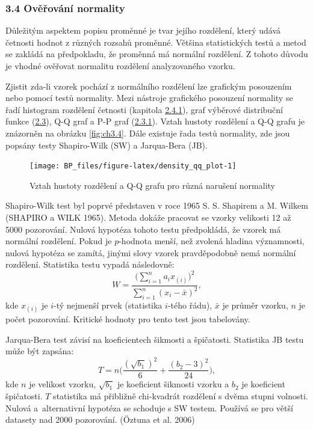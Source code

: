 \documentclass[12pt,]{article}
\begin{document}
\hypertarget{normtests}{\subsubsection{3.4 Ověřování
normality}\label{normtests}}

\qquad Důležitým aspektem popisu proměnné je tvar jejího rozdělení,
který udává četnosti hodnot z různých rozsahů proměnné. Většina
statistických testů a metod se zakládá na předpokladu, že proměnná má
normální rozdělení. Z tohoto důvodu je vhodné ověřovat normalitu
rozdělení analyzovaného vzorku.

\qquad Zjistit zda-li vzorek pochází z normálního rozdělení lze
grafickým posouzením nebo pomocí testů normality. Mezi nástroje
grafického posouzení normality se řadí histogram rozdělení četnosti
(kapitola \protect\hyperlink{hist}{2.4.1}), graf výběrové distribuční
funkce (\protect\hyperlink{distribution}{2.3}), Q-Q graf a P-P graf
(\protect\hyperlink{qqpp}{2.3.1}). Vztah hustoty rozdělení a Q-Q grafu
je znázorněn na obrázku \ref{fig:ch3.4}. Dále existuje řada testů
normality, zde jsou popsány testy Shapiro-Wilk (SW) a Jarqua-Bera (JB).

\begin{figure}[H]

{\centering \texttt{[image: BP\_files/figure-latex/density\_qq\_plot-1]} 

}

\caption{\label{fig:ch3.4} Vztah hustoty rozdělení a Q-Q grafu pro různá narušení normality}\label{fig:density_qq_plot}
\end{figure}

\qquad Shapiro-Wilk test byl poprvé představen v roce 1965 S. S.
Shapirem a M. Wilkem (SHAPIRO a WILK 1965). Metoda dokáže pracovat se
vzorky velikosti 12 až 5000 pozorování. Nulová hypotéza tohoto testu
předpokládá, že vzorek má normální rozdělení. Pokud je \(p\)-hodnota
menší, než zvolená hladina významnosti, nulová hypotéza se zamítá,
jinými slovy vzorek pravděpodobně nemá normální rozdělení. Statistika
testu vypadá následovně:
\[W = \frac{\big(\sum \limits^n_{i=1} a_i x_{(i)}\big)^2}{\sum \limits^n_{i=1}(x_i - \bar{x})^2},\]
kde \(x_{(i)}\) je \(i\)-tý nejmenší prvek (statistika \(i\)-tého řádu),
\(\bar{x}\) je průměr vzorku, \(n\) je počet pozorování. Kritické
hodnoty pro tento test jsou tabelovány.

\qquad Jarqua-Bera test závisí na koeficientech šikmosti a špičatosti.
Statistika JB testu může být zapsána:
\[T = n \bigg( \frac{(\sqrt{b_1})^2}{6} + \frac{(b_2 - 3)^2}{24} \bigg),\]
kde \(n\) je velikost vzorku, \(\sqrt{b_1}\) je koeficient šikmosti
vzorku a \(b_2\) je koeficient špičatosti. \(T\) statistika má přibližně
chi-kvadrát rozdělení s dvěma stupni volnosti. Nulová a~alternativní
hypotéza se schoduje s SW testem. Používá se pro větší datasety nad 2000
pozorování. (Öztuna et al. 2006)
\end{document}
